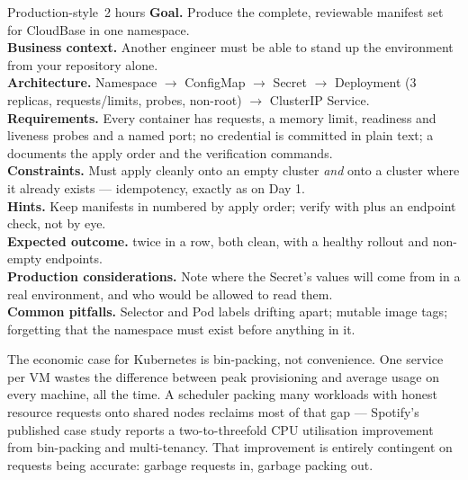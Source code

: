 \begin{minilab}{Production-style}{~2 hours}
\textbf{Goal.} Produce the complete, reviewable manifest set for CloudBase in one namespace.\\
\textbf{Business context.} Another engineer must be able to stand up the environment from your repository alone.\\
\textbf{Architecture.} Namespace $\rightarrow$ ConfigMap $\rightarrow$ Secret $\rightarrow$ Deployment (3 replicas, requests/limits, probes, non-root) $\rightarrow$ ClusterIP Service.\\
\textbf{Requirements.} Every container has requests, a memory limit, readiness and liveness probes and a named port; no credential is committed in plain text; a  documents the apply order and the verification commands.\\
\textbf{Constraints.} Must apply cleanly onto an empty cluster \emph{and} onto a cluster where it already exists --- idempotency, exactly as on Day 1.\\
\textbf{Hints.} Keep manifests in  numbered by apply order; verify with  plus an endpoint check, not by eye.\\
\textbf{Expected outcome.}  twice in a row, both clean, with a healthy rollout and non-empty endpoints.\\
\textbf{Production considerations.} Note where the Secret's values will come from in a real environment, and who would be allowed to read them.\\
\textbf{Common pitfalls.} Selector and Pod labels drifting apart; mutable image tags; forgetting that the namespace must exist before anything in it.
\end{minilab}


\begin{scalenote}
The economic case for Kubernetes is bin-packing, not convenience. One service per VM wastes the difference between peak provisioning and average usage on every machine, all the time. A scheduler packing many workloads with honest resource requests onto shared nodes reclaims most of that gap --- Spotify's published case study reports a two-to-threefold CPU utilisation improvement from bin-packing and multi-tenancy. That improvement is entirely contingent on requests being accurate: garbage requests in, garbage packing out.
\end{scalenote}

